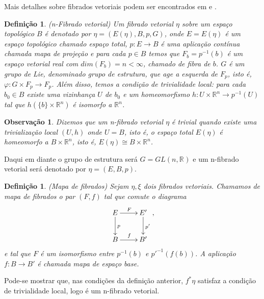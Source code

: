 \documentclass[12pt]{book}
\newtheorem{definicao}[teorema]{Definição}
\newtheorem{observacao}[teorema]{Observação}
\newcommand{\real}[1]{\mathbb{R}^{#1}}
\begin{document}
	Mais detalhes sobre fibrados vetoriais podem ser encontrados em \cite{nakahara} e \cite{husemoller_fibrados}.
	
	\begin{definicao}
		(n-Fibrado vetorial) Um fibrado vetorial $\eta$ sobre um espaço topológico $B$ é denotado por $\eta = (E(\eta), B, p, G)$, onde $E=E(\eta)$ é um espaço topológico chamado espaço total, $p:E\to B$ é uma aplicação contínua chamada mapa de projeção e para cada $p \in B$ temos que $F_{b}=p^{-1}(b)$ é um espaço vetorial real com $dim(F_{b}) = n < \infty$, chamado de fibra de $b$. $G$ é um grupo de Lie, denominado grupo de estrutura, que age a esquerda de $F_{p}$, isto é, $\varphi:G\times F_{p} \to F_{p}$. Além disso, temos a condição de trivialidade local: para cada $b_{0} \in B$ existe uma vizinhança $U$ de $b_{0}$ e um homeomorfismo $h:U\times\real{n} \to p^{-1}(U)$ tal que $h(\{b\} \times \real{n})$ é isomorfo a $\real{n}$.
	\end{definicao}
	
	\begin{observacao}\label{observacao_fibrado_vetorial_trivial}
		Dizemos que um n-fibrado vetorial $\eta$ é trivial quando existe uma trivialização local $(U, h)$ onde $U = B$, isto é, o espaço total $E(\eta)$ é homeomorfo a $B\times \real{n}$, isto é, $E(\eta)\cong B\times \real{n}$.
	\end{observacao}
	
	Daqui em diante o grupo de estrutura será $G = GL(n,\real{})$ e um n-fibrado vetorial será denotado por $\eta = (E,B,p)$.
	
	\begin{definicao}
		(Mapa de fibrados) Sejam $\eta, \xi$ dois fibrados vetoriais. Chamamos de mapa de fibrados o par $(F, f)$ tal que comute o diagrama
		$$
		\xymatrix{
			E \ar[r]^{F}\ar[d]^{p} & E'\ar[d]^{p'}
			\\
			B\ar[r]^{f} & B'
		},
		$$
		e tal que $F$ é um isomorfismo entre $p^{-1}(b)$ e $p'^{-1}(f(b))$. A aplicação $f:B\to B'$ é chamada mapa de espaço base.
	\end{definicao}
	
	Pode-se mostrar que, nas condições da definição anterior, $f^{*}\eta$ satisfaz a condição de trivialidade local, logo é um n-fibrado vetorial.
	
\end{document}
